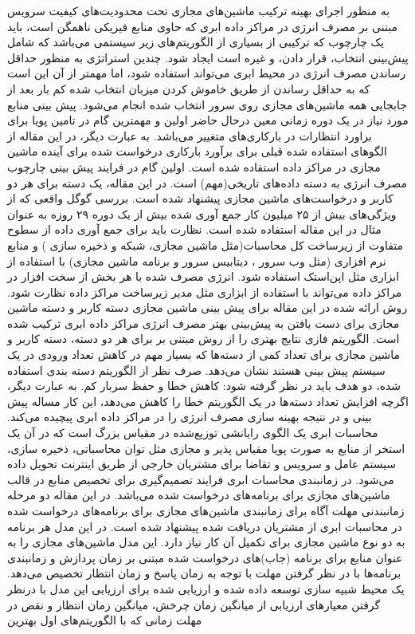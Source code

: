 به منظور اجرای بهینه ترکیب ماشین‌های مجازی تحت محدودیت‌های کیفیت سرویس
مبتنی بر مصرف انرژی در مراکز داده ابری که حاوی منابع فیزیکی ناهمگن است، باید یک چارچوب که ترکیبی از بسیاری از الگوریتم‌های زیر سیستمی‌ می‌باشد که شامل  پیش‌بینی انتخاب، قرار دادن، و غیره است ایجاد شود. چندین استراتژی به منظور حداقل رساندن مصرف انرژی در محیط ابری می‌تواند استفاده شود، اما مهمتر از آن این است که به حداقل رساندن از طریق خاموش کردن میزبان انتخاب شده کم بار بعد از جابجایی همه ماشین‌های مجازی روی سرور انتخاب شده انجام می‌شود. پیش بینی منابع مورد نیاز در یک دوره زمانی معین درحال حاضر اولین و مهمترین گام در تامین پویا برای براورد انتظارات
 در بارکاری‌های متغییر می‌باشد. به عبارت دیگر، در این مقاله 
\cite{num12}
 از الگوهای استفاده شده قبلی برای برآورد بارکاری درخواست شده برای آینده ماشین مجازی در مراکز داده  استفاده شده است. اولین گام در فرایند پیش بینی چارچوب مصرف انرژی به دسته داده‌های تاریخی(مهم) است. در این مقاله، یک دسته برای هر دو کاربر و درخواست‌های ماشین مجازی پیشنهاد شده است. بررسی گوگل واقعی که از ویژگی‌های بیش از ۲۵ میلیون کار جمع آوری شده بیش از یک دوره ۲۹ روزه به عنوان مثال در این مقاله استفاده شده است. نظارت باید برای جمع آوری داده از سطوح متفاوت از زیرساخت کل محاسبات(مثل ماشین مجازی، شبکه و ذخیره سازی ) و منابع نرم افزاری (مثل وب سرور ، دیتابیس سرور و برنامه ماشین مجازی) با استفاده از ابزاری مثل‌ اپن‌استک استفاده شود. انرژی مصرف شده با هر بخش از سخت افزار در مراکز داده می‌تواند با استفاده از ابزاری مثل مدیر زیرساخت مراکز داده 
  نظارت شود. روش ارائه شده در این مقاله برای پیش بینی ماشین مجازی دسته کاربر و دسته ماشین مجازی برای دست یافتن به پیش‌بینی بهتر مصرف انرژی مراکز داده ابری ترکیب شده است. الگوریتم فازی
   نتایج بهتری را از روش مبتنی بر
   برای هر دو دسته، دسته کاربر و ماشین مجازی برای تعداد کمی‌ از دسته‌ها که بسیار مهم در کاهش تعداد ورودی در یک سیستم پیش بینی هستند نشان می‌دهد. صرف نظر از الگوریتم دسته بندی استفاده شده، دو هدف باید در نظر گرفته شود: کاهش خطا و حفظ سربار کم. به عبارت دیگر، اگرچه افزایش تعداد دسته‌ها در یک الگوریتم خطا را کاهش می‌دهد، این کار مساله پیش بینی و در نتیجه بهینه سازی مصرف انرژی را در مراکز داده ابری پیچیده می‌کند.
محاسبات ابری یک الگوی رایانشی توزیع‌شده در مقیاس بزرگ است که در آن یک استخر از منابع به صورت پویا مقیاس پذیر و مجازی مثل توان محاسباتی، ذخیره سازی، سیستم عامل و سرویس و تقاضا برای مشتریان خارجی از طریق اینترنت تحویل داده می‌شود. در زمانبندی محاسبات ابری فرایند تصمیم‌گیری برای تخصیص منابع در قالب ماشین‌های مجازی برای برنامه‌های درخواست شده می‌باشد. در این مقاله
\cite{num13}
دو مرحله زمانبندنی مهلت آگاه برای زمانبندی ماشین‌های مجازی برای برنامه‌های درخواست شده در محاسبات ابری از مشتریان دریافت شده پیشنهاد شده است. در این مدل هر برنامه به دو نوع ماشین مجازی برای تکمیل آن کار نیاز دارد. این مدل ماشین‌های مجازی را به عنوان منابع برای برنامه (جاب)‌های درخواست شده مبتنی بر زمان پردازش و زمانبندی برنامه‌ها با در نظر گرفتن مهلت با توجه به زمان پاسخ و زمان انتظار تخصیص می‌دهد. یک محیط شبیه سازی توسعه داده شده و ارزیابی شده برای ارزیابی این مدل با درنظر گرفتن معیارهای ارزیابی از میانگین زمان چرخش، میانگین زمان انتظار و نقض در مهلت زمانی که با الگوریتم‌های اول بهترین 
